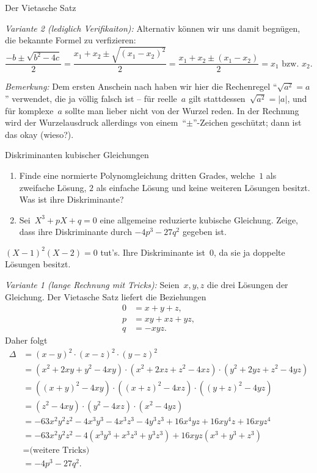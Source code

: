 \documentclass{algblatt}
\begin{document}
\begin{aufgabe}{Der Vietasche Satz}
\begin{loesungE}
\emph{Variante 2 (lediglich Verifikaiton):} Alternativ können wir uns damit
begnügen, die bekannte Formel zu verfizieren:
\[ \frac{-b \pm \sqrt{b^2 - 4c}}{2} =
  \frac{x_1 + x_2 \pm \sqrt{(x_1 - x_2)^2}}{2} =
  \frac{x_1 + x_2 \pm (x_1 - x_2)}{2} =
  \text{$x_1$ bzw. $x_2$}. \]

\emph{Bemerkung:} Dem ersten Anschein nach haben wir hier die Rechenregel
"`$\sqrt{a^2} = a$"' verwendet, die ja völlig falsch ist -- für reelle~$a$ gilt
stattdessen~$\sqrt{a^2} = |a|$, und für komplexe~$a$ sollte man lieber nicht
von der Wurzel reden. In der Rechnung wird der Wurzelausdruck allerdings von
einem~"`$\pm$"'-Zeichen geschützt; dann ist das okay (wieso?).
\end{loesungE}
\end{aufgabe}

\begin{aufgabe}{Diskriminanten kubischer Gleichungen}
\begin{enumerate}
\item Finde eine normierte Polynomgleichung dritten Grades, welche~$1$
als zweifache Lösung, $2$ als einfache Lösung und keine weiteren Lösungen
besitzt. Was ist ihre Diskriminante?
\item Sei~$X^3 + p X + q = 0$ eine allgemeine reduzierte kubische Gleichung.
Zeige, dass ihre Diskriminante durch $-4 p^3 - 27 q^2$ gegeben ist.
\end{enumerate}
\begin{loesungE}
\item $(X - 1)^2 (X - 2) = 0$ tut's. Ihre Diskriminante ist~$0$, da sie ja
doppelte Lösungen besitzt.

\item \emph{Variante 1 (lange Rechnung mit Tricks):} Seien~$x,y,z$ die drei Lösungen der
Gleichung. Der Vietasche Satz liefert die Beziehungen
\begin{align*}
  0 &= x+y+z, \\
  p &= xy + xz + yz, \\
  q &= -xyz.
\end{align*}
Daher folgt
\begin{align*}
  \Delta &= (x-y)^2 \cdot (x-z)^2 \cdot (y-z)^2 \\
  &= (x^2+2xy+y^2-4xy) \cdot (x^2+2xz+z^2-4xz) \cdot (y^2+2yz+z^2-4yz) \\
  &= ((x+y)^2-4xy) \cdot ((x+z)^2-4xz) \cdot ((y+z)^2-4yz) \\
  &= (z^2-4xy) \cdot (y^2-4xz) \cdot (x^2-4yz) \\
  &= -63x^2y^2z^2 -4x^3y^3 - 4x^3z^3 - 4y^3z^3 + 16x^4yz + 16xy^4z + 16xyz^4 \\
  &= -63x^2y^2z^2 - 4(x^3y^3 + x^3z^3 + y^3z^3) + 16 xyz (x^3+y^3+z^3) \\
  &= \text{(weitere Tricks)} \\
  &= -4p^3 - 27q^2.
\end{align*}


\end{loesungE}
\end{aufgabe}
\end{document}
